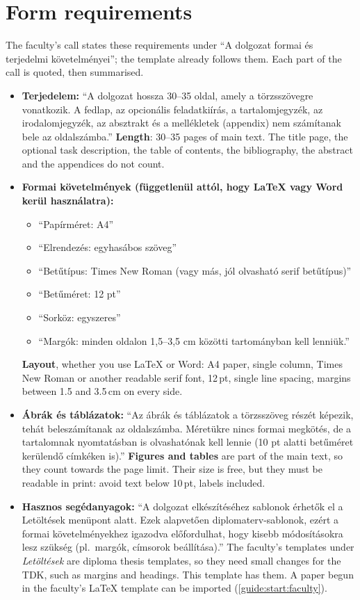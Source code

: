 \section{Form requirements}\label{guide:tdk:form}
The faculty's call states these requirements under \enquote{A dolgozat formai és terjedelmi követelményei}; the template already follows them. Each part of the call is quoted, then summarised.
\begin{itemize}
  \item \textbf{Terjedelem:} \enquote{A dolgozat hossza 30--35 oldal, amely a törzsszövegre vonatkozik. A fedlap, az opcionális feladatkiírás, a tartalomjegyzék, az irodalomjegyzék, az absztrakt és a mellékletek (appendix) nem számítanak bele az oldalszámba.}
  \textbf{Length}: 30--35 pages of main text. The title page, the optional task description, the table of contents, the bibliography, the abstract and the appendices do not count.
  \item \textbf{Formai követelmények (függetlenül attól, hogy LaTeX vagy Word kerül használatra):}
  \begin{itemize}[noitemsep]
    \item \enquote{Papírméret: A4}
    \item \enquote{Elrendezés: egyhasábos szöveg}
    \item \enquote{Betűtípus: Times New Roman (vagy más, jól olvasható serif betűtípus)}
    \item \enquote{Betűméret: 12 pt}
    \item \enquote{Sorköz: egyszeres}
    \item \enquote{Margók: minden oldalon 1,5--3,5 cm közötti tartományban kell lenniük.}
  \end{itemize}
  \textbf{Layout}, whether you use \LaTeX{} or Word: A4 paper, single column, Times New Roman or another readable serif font, 12\,pt, single line spacing, margins between 1.5 and 3.5\,cm on every side.
  \item \textbf{Ábrák és táblázatok:} \enquote{Az ábrák és táblázatok a törzsszöveg részét képezik, tehát beleszámítanak az oldalszámba. Méretükre nincs formai megkötés, de a tartalomnak nyomtatásban is olvashatónak kell lennie (10 pt alatti betűméret kerülendő címkéken is).}
  \textbf{Figures and tables} are part of the main text, so they count towards the page limit. Their size is free, but they must be readable in print: avoid text below 10\,pt, labels included.
  \item \textbf{Hasznos segédanyagok:} \enquote{A dolgozat elkészítéséhez sablonok érhetők el a Letöltések menüpont alatt. Ezek alapvetően diplomaterv-sablonok, ezért a formai követelményekhez igazodva előfordulhat, hogy kisebb módosításokra lesz szükség (pl.\ margók, címsorok beállítása).}
  The faculty's templates under \emph{Letöltések} are diploma thesis templates, so they need small changes for the TDK, such as margins and headings. This template has them. A paper begun in the faculty's \LaTeX{} template can be imported (\cref{guide:start:faculty}).
\end{itemize}

